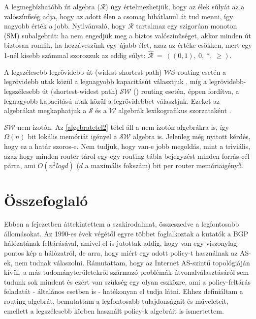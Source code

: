   A legmegbízhatóbb út algebra ($\mathcal{R}$) úgy értelmezhetjük, hogy az élek súlyát az a valószínűség adja, hogy az adott élen a csomag hibátlanul át tud menni, így nagyobb érték a jobb. Nyilvánvaló, hogy $\mathcal{R}$ tartalmaz egy szigorúan monoton (SM) subalgebrát: ha nem engedjük meg a biztos valószínűséget, akkor minden út biztosan romlik, ha hozzáveszünk egy újabb élet, azaz az értéke csökken, mert egy 1-nél kisebb számmal szorozzuk az eddig súlyt: $\hat{\mathcal{R}}~=~((0,1),~0,~*,~\geq)$.

  A legszélesebb-legrövidebb út (widest-shortest path) $\mathcal{WS}$ routing esetén a legrövidebb utak közül a legnagyobb kapacitásút választjuk \cite{Quality_of_service_based_routing_A_performance_perspective}, míg a legrövidebb-legszélesebb út (shortest-widest path) $\mathcal{SW}$ (\cite{Quality_of_service_routing_for_supporting_multimedia_applications, On_path_selection_for_traffic_with_bandwidth_guarantees}) routing esetén, éppen fordítva, a legnagyobb kapacitású utak közül a legrövidebbet választjuk. Ezeket az algebrákat megkaphatjuk a $\mathcal{S}$ és a $\mathcal{W}$ algebrák lexikografikus szorzataként \cite{Lexicographic_products_in_metarouting}.
  \begin{note}
    $\mathcal{SW}$ nem izotón. Az \eqref{algebratetel2} tétel áll a nem izotón algebrákra is, így $\Omega(n)$ bit lokális memóriát igényel a $\mathcal{SW}$ algebra is. Jelenleg még nyitott kérdés, hogy ez a határ szoros-e. Nem tudjuk, hogy van-e jobb megoldás, mint a triviális, azaz hogy minden router tárol egy-egy routing tábla bejegyzést minden forrás-cél párra, ami $O(n^2 log d)$ ($d$ a maximális fokszám) bit per router memóriaigényű.
  \end{note}

  \section{Összefoglaló}\label{section_osszefoglalo1}

  Ebben a fejezetben áttekintettem a szakirodalmat, összeszedve a legfontosabb állomásokat. Az 1990-es évek végétől egyre többet foglalkoztak a kutatók a BGP hálózatának feltárásával, amivel el is jutottak addig, hogy van egy viszonylag pontos kép a hálózatról, de arra, hogy miért egy adott policy-t használnak az AS-ek, nem tudnak válaszolni. Rámutattam, hogy az Internet AS-szintű topológiáján kívül, a más tudományterületekről származó problémák útvonalválasztásáról sem tudunk sok mindent és ezért van szükség egy olyan eszközre, ami a policy-feltárás feladatát - általános esetben is - hatékonyan el tudja látni. Ehhez definiáltam a routing algebrát, bemutattam a legfontosabb tulajdonságait és műveleteit, emellett a legszélesebb körben használt policy-k algebráit is ismertettem.